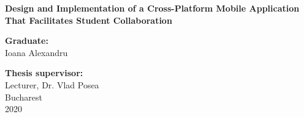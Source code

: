 \begin{center}
{\LARGE
	\textbf{Design and Implementation of a Cross-Platform Mobile Application That Facilitates Student Collaboration}
}

\vspace{3cm}
\textbf{Graduate:}\\
Ioana Alexandru

\bigskip
\bigskip

\textbf{Thesis supervisor:}\\
Lecturer, Dr. Vlad Posea \\

Bucharest \\
2020 \\
\vspace*{1cm}
\end{center}
